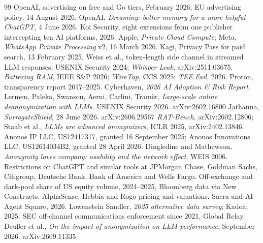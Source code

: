 \documentclass[9pt,twocolumn,a4paper]{extarticle}
\begin{document}
\begin{thebibliography}{99}
\fontsize{6.6}{7.8}\selectfont
\setlength{\itemsep}{0pt}
 OpenAI, advertising on free and Go tiers, February 2026; EU advertising policy, 14 August 2026.
 OpenAI, \emph{Dreaming: better memory for a more helpful ChatGPT}, 4 June 2026.
 Koi Security, eight extensions from one publisher intercepting ten AI platforms, 2026.
 Apple, \emph{Private Cloud Compute}; Meta, \emph{WhatsApp Private Processing} v2, 16 March 2026.
 Kagi, Privacy Pass for paid search, 13 February 2025.
 Weiss et al., token-length side channel in streamed LLM responses, USENIX Security 2024; \emph{Whisper Leak}, arXiv:2511.03675.
 \emph{Battering RAM}, IEEE S\&P 2026; \emph{WireTap}, CCS 2025; \emph{TEE.Fail}, 2026.
 Proton, transparency report 2017--2025.
 Cyberhaven, \emph{2026 AI Adoption \& Risk Report}.
 Lermen, Paleka, Swanson, Aerni, Carlini, Tramèr, \emph{Large-scale online deanonymization with LLMs}, USENIX Security 2026. arXiv:2602.16800
 Jathanna, \emph{SurrogateShield}, 28 June 2026. arXiv:2606.29567
 \emph{RAT-Bench}, arXiv:2602.12806; Staab et al., \emph{LLMs are advanced anonymizers}, ICLR 2025, arXiv:2402.13846.
 Anonos IP LLC, US12417317, granted 16 September 2025; Anonos Innovations LLC, US12614034B2, granted 28 April 2026.
 Dingledine and Mathewson, \emph{Anonymity loves company: usability and the network effect}, WEIS 2006.
 Restrictions on ChatGPT and similar tools at JPMorgan Chase, Goldman Sachs, Citigroup, Deutsche Bank, Bank of America and Wells Fargo.
 Off-exchange and dark-pool share of US equity volume, 2024--2025, Bloomberg data via New Constructs.
 AlphaSense, Hebbia and Rogo pricing and valuations, Sacra and AI Agent Square, 2026.
 Lowenstein Sandler, \emph{2025 alternative data survey}; Kadoa, 2025.
 SEC off-channel communications enforcement since 2021, Global Relay.
 Deußer et al., \emph{On the impact of anonymization on LLM performance}, September 2026. arXiv:2609.11335
\end{thebibliography}
\end{document}
